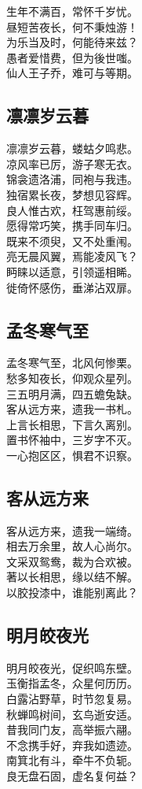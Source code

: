 \documentclass[]{article}
\begin{document}
生年不满百，常怀千岁忧。\\
昼短苦夜长，何不秉烛游！\\
为乐当及时，何能待来兹？\\
愚者爱惜费，但为後世嗤。\\
仙人王子乔，难可与等期。

\hypertarget{header-n66}{%
\subsection{凛凛岁云暮}\label{header-n66}}

凛凛岁云暮，蝼蛄夕鸣悲。\\
凉风率已厉，游子寒无衣。\\
锦衾遗洛浦，同袍与我违。\\
独宿累长夜，梦想见容辉。\\
良人惟古欢，枉驾惠前绥。\\
愿得常巧笑，携手同车归。\\
既来不须臾，又不处重闱。\\
亮无晨风翼，焉能凌风飞？\\
眄睐以适意，引领遥相睎。\\
徙倚怀感伤，垂涕沾双扉。

\hypertarget{header-n70}{%
\subsection{孟冬寒气至}\label{header-n70}}

孟冬寒气至，北风何惨栗。\\
愁多知夜长，仰观众星列。\\
三五明月满，四五蟾兔缺。\\
客从远方来，遗我一书札。\\
上言长相思，下言久离别。\\
置书怀袖中，三岁字不灭。\\
一心抱区区，惧君不识察。

\hypertarget{header-n74}{%
\subsection{客从远方来}\label{header-n74}}

客从远方来，遗我一端绮。\\
相去万余里，故人心尚尔。\\
文采双鸳鸯，裁为合欢被。\\
著以长相思，缘以结不解。\\
以胶投漆中，谁能别离此？

\hypertarget{header-n78}{%
\subsection{明月皎夜光}\label{header-n78}}

明月皎夜光，促织鸣东壁。\\
玉衡指孟冬，众星何历历。\\
白露沾野草，时节忽复易。\\
秋蝉鸣树间，玄鸟逝安适。\\
昔我同门友，高举振六翮。\\
不念携手好，弃我如遗迹。\\
南箕北有斗，牵牛不负轭。\\
良无盘石固，虚名复何益？
\end{document}
